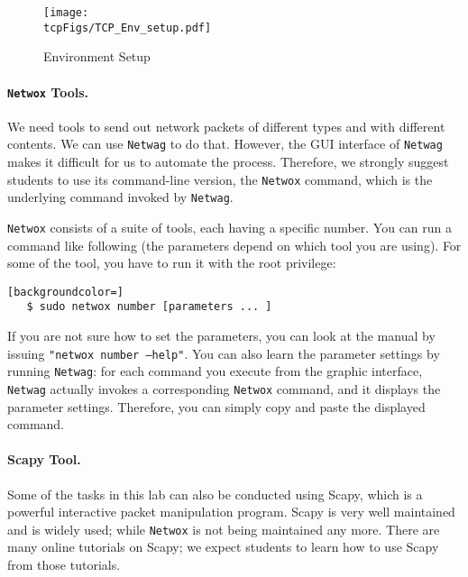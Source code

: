 \begin{figure}[htb]
  \begin{center}
    \texttt{[image: \\tcpFigs/TCP\_Env\_setup.pdf]}
  \end{center}
  \caption{Environment Setup}
  \label{tcp:fig:env}
\end{figure}
 



\paragraph{{\tt Netwox} Tools.}
We need tools to send out network packets of different types and with different
contents. We can use {\tt Netwag} to do that. However, the GUI interface of {\tt Netwag} 
makes it difficult for us to automate the process. Therefore, we strongly 
suggest students to use its command-line version, the
{\tt Netwox} command, which is the underlying command invoked by {\tt Netwag}.  

{\tt Netwox} consists of a suite of tools, each having a specific number. 
You can run a command like following (the parameters depend on
which tool you are using). For some of the tool, you have to run it 
with the root privilege: 

\begin{lstlisting}[backgroundcolor=]
   $ sudo netwox number [parameters ... ]
\end{lstlisting}


If you are not sure how to set the parameters, you can look at the 
manual by issuing {\tt "netwox number --help"}.
You can also learn the parameter settings by running {\tt Netwag}:
for each command you execute from the graphic interface, {\tt Netwag} 
actually invokes a corresponding {\tt Netwox} command, and it displays
the parameter settings. Therefore, you can simply copy and paste 
the displayed command.


\paragraph{Scapy Tool.}
Some of the tasks in this lab can also be conducted using Scapy, which 
is a powerful interactive packet manipulation program. 
Scapy is very well maintained and is widely used; while
\texttt{Netwox} is not being maintained any more. There are many online tutorials on Scapy; we
expect students to learn how to use Scapy from those tutorials. 





